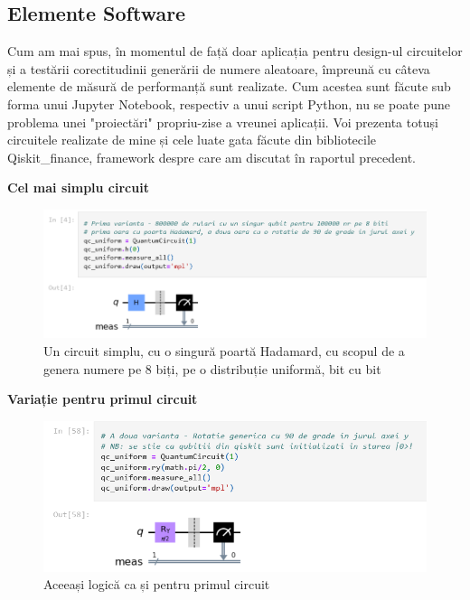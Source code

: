 \documentclass[12pt]{report}
\begin{document}
\subsection*{Elemente Software}

Cum am mai spus, în momentul de față doar aplicația pentru design-ul circuitelor și a testării corectitudinii generării de numere aleatoare, împreună cu câteva elemente de măsură de performanță sunt realizate. Cum acestea sunt făcute sub forma unui Jupyter Notebook, respectiv a unui script Python, nu se poate pune problema unei "proiectări" propriu-zise a vreunei aplicații. Voi prezenta totuși circuitele realizate de mine și cele luate gata făcute din bibliotecile Qiskit\_finance, framework despre care am discutat în raportul precedent.

\vspace{0.5cm}
\textbf{Cel mai simplu circuit}
\begin{figure}[H]
    \centering
    \includegraphics[scale=0.80]{anexe/figuri/CircuitHadamard1.png}
    \caption{Un circuit simplu, cu o singură poartă Hadamard, cu scopul de a genera numere pe 8 biți, pe o distribuție uniformă, bit cu bit}
    \label{fig:CircuitHadamard1}
\end{figure}

\textbf{Variație pentru primul circuit}
\begin{figure}[H]
    \centering
    \includegraphics[scale=0.80]{anexe/figuri/CircuitRy1.png}
    \caption{Aceeași logică ca și pentru primul circuit}
    \label{fig:CircuitRy1}
\end{figure}
\end{document}
